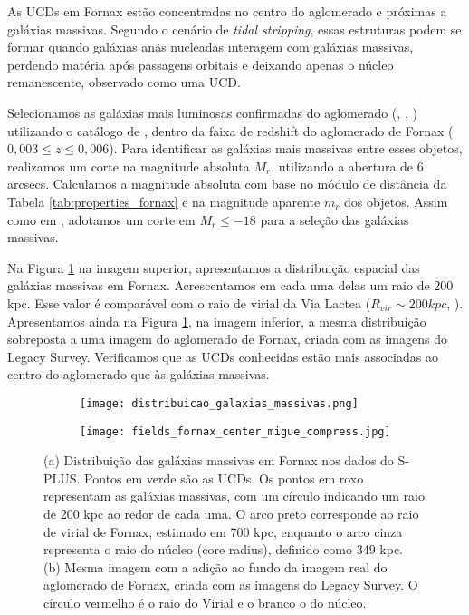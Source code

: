 As UCDs em Fornax estão concentradas no centro do aglomerado e próximas a galáxias massivas. Segundo o cenário de {\it tidal stripping}, essas estruturas podem se formar quando galáxias anãs nucleadas interagem com galáxias massivas, perdendo matéria após passagens orbitais e deixando apenas o núcleo remanescente, observado como uma UCD.

Selecionamos as galáxias mais luminosas confirmadas do aglomerado (\citealp{Ferguson_1989}, \citealp{Jordan_2007}, \citealp{Venhola_2018}) utilizando o catálogo de \cite{Lima_2024}, dentro da faixa de redshift do aglomerado de Fornax ($0,003\leq z\leq0,006$). Para identificar as galáxias mais massivas entre esses objetos, realizamos um corte na magnitude absoluta $M_r$, utilizando a abertura de 6 arcsecs. Calculamos a magnitude absoluta com base no módulo de distância da Tabela \ref{tab:properties_fornax} e na magnitude aparente $m_r$ dos objetos. Assim como em \cite{Saifollahi_2021}, adotamos um corte em $M_r \leq -18$ para a seleção das galáxias massivas.

Na Figura \ref{distribuicao_galaxias_massivas} na imagem superior, apresentamos a distribuição espacial das galáxias massivas em Fornax. Acrescentamos em cada uma delas um raio de 200 kpc. Esse valor é comparável com o raio de virial da Via Lactea ($R_{vir}\sim 200kpc$, \cite{Dehnen_2006}). Apresentamos ainda na Figura \ref{distribuicao_galaxias_massivas}, na imagem inferior, a mesma distribuição sobreposta a uma imagem do aglomerado de Fornax, criada com as imagens do Legacy Survey. Verificamos que as UCDs conhecidas estão mais associadas ao centro do aglomerado que às galáxias massivas.

\begin{figure}[!ht]
\centering
\captionsetup{justification=centering}
\begin{subfigure}[b]{0.75\textwidth}
    \texttt{[image: distribuicao\_galaxias\_massivas.png]}
    \caption{}
\end{subfigure}
\begin{subfigure}[b]{0.75\textwidth}
    \texttt{[image: fields\_fornax\_center\_migue\_compress.jpg]}
    \caption{}
\end{subfigure}
\caption{(a) Distribuição das galáxias massivas em Fornax nos dados do S-PLUS. Pontos em verde são as UCDs. Os pontos em roxo representam as galáxias massivas, com um círculo indicando um raio de 200 kpc ao redor de cada uma. O arco preto corresponde ao raio de virial de Fornax, estimado em 700 kpc, enquanto o arco cinza representa o raio do núcleo (core radius), definido como 349 kpc.\\ (b) Mesma imagem com a adição ao fundo da imagem real do aglomerado de Fornax, criada com as imagens do Legacy Survey. O círculo vermelho é o raio do Virial e o branco o do núcleo.}
\label{distribuicao_galaxias_massivas}
\end{figure}

